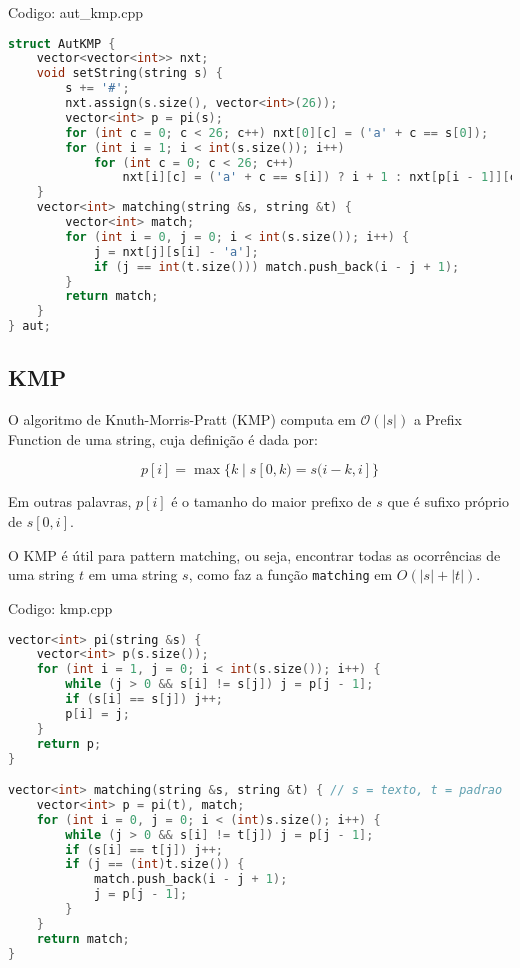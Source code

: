 \documentclass[10pt, a4paper, oneside]{book}
\begin{document}
Codigo: aut\_kmp.cpp

\begin{lstlisting}[language=C++]
struct AutKMP {
    vector<vector<int>> nxt;
    void setString(string s) {
        s += '#';
        nxt.assign(s.size(), vector<int>(26));
        vector<int> p = pi(s);
        for (int c = 0; c < 26; c++) nxt[0][c] = ('a' + c == s[0]);
        for (int i = 1; i < int(s.size()); i++)
            for (int c = 0; c < 26; c++)
                nxt[i][c] = ('a' + c == s[i]) ? i + 1 : nxt[p[i - 1]][c];
    }
    vector<int> matching(string &s, string &t) {
        vector<int> match;
        for (int i = 0, j = 0; i < int(s.size()); i++) {
            j = nxt[j][s[i] - 'a'];
            if (j == int(t.size())) match.push_back(i - j + 1);
        }
        return match;
    }
} aut;
\end{lstlisting}
\hfill

\subsection{KMP}


O algoritmo de Knuth-Morris-Pratt (KMP) computa em $\mathcal{O}(|s|)$ a Prefix Function de uma string, cuja definição é dada por:



$$ p[i] = \max\{k \mid s[0,k) = s(i-k,i]\} $$



Em outras palavras, $p[i]$ é o tamanho do maior prefixo de $s$ que é sufixo próprio de $s[0,i]$.



O KMP é útil para pattern matching, ou seja, encontrar todas as ocorrências de uma string $t$ em uma string $s$, como faz a função \texttt{matching} em $O(|s| + |t|)$.
\hfill

Codigo: kmp.cpp

\begin{lstlisting}[language=C++]
vector<int> pi(string &s) {
    vector<int> p(s.size());
    for (int i = 1, j = 0; i < int(s.size()); i++) {
        while (j > 0 && s[i] != s[j]) j = p[j - 1];
        if (s[i] == s[j]) j++;
        p[i] = j;
    }
    return p;
}

vector<int> matching(string &s, string &t) { // s = texto, t = padrao
    vector<int> p = pi(t), match;
    for (int i = 0, j = 0; i < (int)s.size(); i++) {
        while (j > 0 && s[i] != t[j]) j = p[j - 1];
        if (s[i] == t[j]) j++;
        if (j == (int)t.size()) {
            match.push_back(i - j + 1);
            j = p[j - 1];
        }
    }
    return match;
}\end{lstlisting}
\hfill
\end{document}
